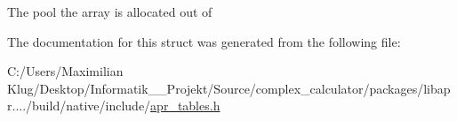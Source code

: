 The pool the array is allocated out of 

The documentation for this struct was generated from the following file\+:\begin{DoxyCompactItemize}
\item 
C\+:/\+Users/\+Maximilian Klug/\+Desktop/\+Informatik\+\_\+\_\+\+Projekt/\+Source/complex\+\_\+calculator/packages/libapr..../build/native/include/\mbox{\hyperlink{apr__tables_8h}{apr\+\_\+tables.\+h}}\end{DoxyCompactItemize}
